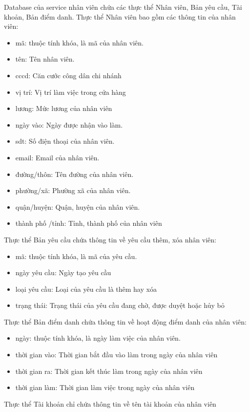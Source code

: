Database của service nhân viên chứa các thực thể Nhân viên, Bản yêu cầu, Tài khoản, Bản điểm danh. Thực thể Nhân viên bao gồm các thông tin của nhân viên:
\begin{itemize}
	\item mã: thuộc tính khóa, là mã của nhân viên.
	\item tên: Tên nhân viên.
	\item cccd: Căn cước công dân chi nhánh
	\item vị trí: Vị trí làm việc trong cửa hàng
	\item lương: Mức lương của nhân viên
	\item ngày vào: Ngày được nhận vào làm.
	\item sdt: Số điện thoại của nhân viên.
	\item email: Email của nhân viên.
	\item đường/thôn: Tên đường của nhân viên.
	\item phường/xã: Phường xã của nhân viên.
	\item quận/huyện: Quận, huyện của nhân viên.
	\item thành phố /tỉnh: Tỉnh, thành phố của nhân viên
\end{itemize}

Thực thể Bản yêu cầu chứa thông tin về yêu cầu thêm, xóa nhân viên:
\begin{itemize}
	\item mã: thuộc tính khóa, là mã của yêu cầu.
	\item ngày yêu cầu: Ngày tạo yêu cầu
	\item loại yêu cầu: Loại của yêu cầu là thêm hay xóa
	\item trạng thái: Trạng thái của yêu cầu đang chờ, được duyệt hoặc hủy bỏ
\end{itemize}

Thực thể Bản điểm danh chứa thông tin về hoạt động điểm danh của nhân viên:
\begin{itemize}
	\item ngày: thuộc tính khóa, là ngày làm việc của nhân viên.
	\item thời gian vào: Thời gian bắt đầu vào làm trong ngày của nhân viên
	\item thời gian ra: Thời gian kết thúc làm trong ngày của nhân viên
	\item thời gian làm: Thời gian làm việc trong ngày của nhân viên
\end{itemize}

Thực thể Tài khoản chỉ chứa thông tin về tên tài khoản của nhân viên

